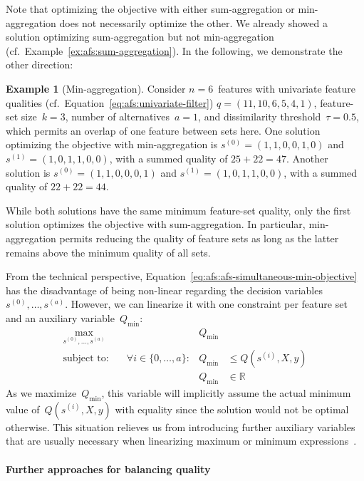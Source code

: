 \documentclass{article}
\theoremstyle{definition}
\newtheorem{example}{Example}
\begin{document}
Note that optimizing the objective with either sum-aggregation or min-aggregation does not necessarily optimize the other.
We already showed a solution optimizing sum-aggregation but not min-aggregation (cf.~Example~\ref{ex:afs:sum-aggregation}).
In the following, we demonstrate the other direction:
%
\begin{example}[Min-aggregation]
Consider $n=6$~features with univariate feature qualities (cf.~Equation~\ref{eq:afs:univariate-filter}) $q = (11,10,6,5,4,1)$, feature-set size~$k=3$, number of alternatives~$a=1$, and dissimilarity threshold~$\tau = 0.5$, which permits an overlap of one feature between sets here.
One solution optimizing the objective with min-aggregation is $s^{(0)} = (1,1,0,0,1,0)$ and $s^{(1)} = (1,0,1,1,0,0)$, with a summed quality of $25+22=47$.
Another solution is $s^{(0)} = (1,1,0,0,0,1)$ and $s^{(1)} = (1,0,1,1,0,0)$, with a summed quality of $22+22=44$.
\label{ex:afs:min-aggregation}
\end{example}
%
While both solutions have the same minimum feature-set quality, only the first solution optimizes the objective with sum-aggregation.
In particular, min-aggregation permits reducing the quality of feature sets as long as the latter remains above the minimum quality of all sets.

From the technical perspective, Equation~\ref{eq:afs:afs-simultaneous-min-objective} has the disadvantage of being non-linear regarding the decision variables $s^{(0)}, \dots, s^{(a)}$.
However, we can linearize it with one constraint per feature set and an auxiliary variable~$Q_{\text{min}}$:
%
\begin{equation}
	\begin{aligned}
		\max_{s^{(0)}, \dots, s^{(a)}} &\quad &Q_{\text{min}} & \\
		\text{subject to:} &\quad \forall i \in \{0, \dots, a\}: &Q_{\text{min}} &\leq Q(s^{(i)},X,y) \\
		&\quad & Q_{\text{min}} &\in \mathbb{R}
	\end{aligned}
	\label{eq:afs:afs-simultaneous-min-objective-linear}
\end{equation}
%
As we maximize~$Q_{\text{min}}$, this variable will implicitly assume the actual minimum value of~$Q(s^{(i)},X,y)$ with equality since the solution would not be optimal otherwise.
This situation relieves us from introducing further auxiliary variables that are usually necessary when linearizing maximum or minimum expressions~\cite{mosek2022modeling}.

\paragraph{Further approaches for balancing quality}
\end{document}
